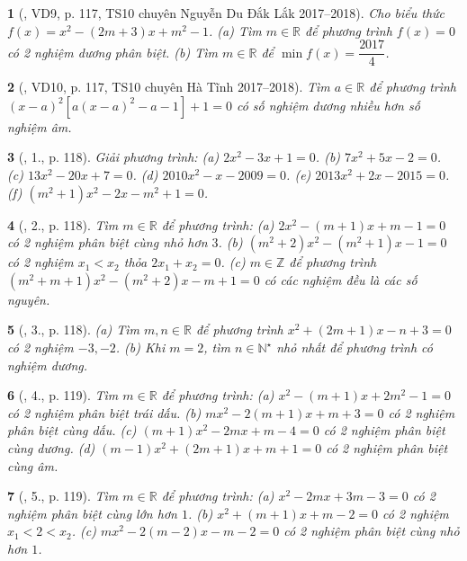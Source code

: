 \documentclass{article}
\newtheorem{baitoan}{}
\begin{document}
\begin{baitoan}[\cite{Thu_Viet_Minh_ptb2}, VD9, p. 117, TS10 chuyên Nguyễn Du Đắk Lắk 2017--2018]
	Cho biểu thức $f(x) = x^2 - (2m + 3)x + m^2 - 1$. (a) Tìm $m\in\mathbb{R}$ để phương trình $f(x) = 0$ có 2 nghiệm dương phân biệt. (b) Tìm $m\in\mathbb{R}$ để $\min f(x) = \dfrac{2017}{4}$.
\end{baitoan}

\begin{baitoan}[\cite{Thu_Viet_Minh_ptb2}, VD10, p. 117, TS10 chuyên Hà Tĩnh 2017--2018]
	Tìm $a\in\mathbb{R}$ để phương trình $(x - a)^2\left[a(x - a)^2 - a - 1\right] + 1 = 0$ có số nghiệm dương nhiều hơn số nghiệm âm.
\end{baitoan}

\begin{baitoan}[\cite{Thu_Viet_Minh_ptb2}, 1., p. 118]
	Giải phương trình: (a) $2x^2 - 3x + 1 = 0$. (b) $7x^2 + 5x - 2 = 0$. (c) $13x^2 - 20x + 7 = 0$. (d) $2010x^2 - x - 2009 = 0$. (e) $2013x^2 + 2x - 2015 = 0$. (f) $(m^2 + 1)x^2 - 2x - m^2 + 1 = 0$.
\end{baitoan}

\begin{baitoan}[\cite{Thu_Viet_Minh_ptb2}, 2., p. 118]
	Tìm $m\in\mathbb{R}$ để phương trình: (a) $2x^2 - (m + 1)x + m - 1 = 0$ có 2 nghiệm phân biệt cùng nhỏ hơn $3$. (b) $(m^2 + 2)x^2 - (m^2 + 1)x - 1 = 0$ có 2 nghiệm $x_1 < x_2$ thỏa $2x_1 + x_2 = 0$. (c) $m\in\mathbb{Z}$ để phương trình $(m^2 + m + 1)x^2 - (m^2 + 2)x - m + 1 = 0$ có các nghiệm đều là các số nguyên.
\end{baitoan}

\begin{baitoan}[\cite{Thu_Viet_Minh_ptb2}, 3., p. 118]
	(a) Tìm $m,n\in\mathbb{R}$ để phương trình $x^2 + (2m + 1)x - n + 3 = 0$ có 2 nghiệm $-3,-2$. (b) Khi $m = 2$, tìm $n\in\mathbb{N}^\star$ nhỏ nhất để phương trình có nghiệm dương.
\end{baitoan}

\begin{baitoan}[\cite{Thu_Viet_Minh_ptb2}, 4., p. 119]
	Tìm $m\in\mathbb{R}$ để phương trình: (a) $x^2 - (m + 1)x + 2m^2 - 1 = 0$ có 2 nghiệm phân biệt trái dấu. (b) $mx^2 - 2(m + 1)x + m + 3 = 0$ có 2 nghiệm phân biệt cùng dấu. (c) $(m + 1)x^2 - 2mx + m - 4 = 0$ có 2 nghiệm phân biệt cùng dương. (d) $(m - 1)x^2 + (2m + 1)x + m + 1 = 0$ có 2 nghiệm phân biệt cùng âm.
\end{baitoan}

\begin{baitoan}[\cite{Thu_Viet_Minh_ptb2}, 5., p. 119]
	Tìm $m\in\mathbb{R}$ để phương trình: (a) $x^2 - 2mx + 3m - 3 = 0$ có 2 nghiệm phân biệt cùng lớn hơn $1$. (b) $x^2 + (m + 1)x + m - 2 = 0$ có 2 nghiệm $x_1 < 2 < x_2$. (c) $mx^2 - 2(m - 2)x - m - 2 = 0$ có 2 nghiệm phân biệt cùng nhỏ hơn $1$.
\end{baitoan}
\end{document}
